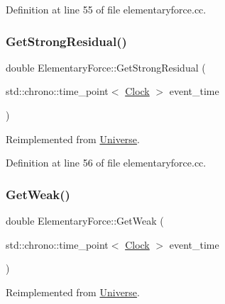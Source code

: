 Definition at line 55 of file elementaryforce.\+cc.

\mbox{\label{class_elementary_force_a3478c8ad35bce240055da7d4a03e555e}} 
\subsubsection{\texorpdfstring{Get\+Strong\+Residual()}{GetStrongResidual()}}
{\footnotesize\ttfamily double Elementary\+Force\+::\+Get\+Strong\+Residual (\begin{DoxyParamCaption}\item[{std\+::chrono\+::time\+\_\+point$<$ \mbox{\hyperlink{universe_8h_a0ef8d951d1ca5ab3cfaf7ab4c7a6fd80}{Clock}} $>$}]{event\+\_\+time }\end{DoxyParamCaption})\hspace{0.3cm}{\ttfamily [virtual]}}



Reimplemented from \mbox{\hyperlink{class_universe_af0f4b81950061e63c2855eb40957a5b1}{Universe}}.



Definition at line 56 of file elementaryforce.\+cc.

\mbox{\label{class_elementary_force_a4669f2ce414e508c70ae4ce0df503ad1}} 
\subsubsection{\texorpdfstring{Get\+Weak()}{GetWeak()}}
{\footnotesize\ttfamily double Elementary\+Force\+::\+Get\+Weak (\begin{DoxyParamCaption}\item[{std\+::chrono\+::time\+\_\+point$<$ \mbox{\hyperlink{universe_8h_a0ef8d951d1ca5ab3cfaf7ab4c7a6fd80}{Clock}} $>$}]{event\+\_\+time }\end{DoxyParamCaption})\hspace{0.3cm}{\ttfamily [virtual]}}



Reimplemented from \mbox{\hyperlink{class_universe_a4476b7e0a3fc1764909f556257fd9ec7}{Universe}}.



